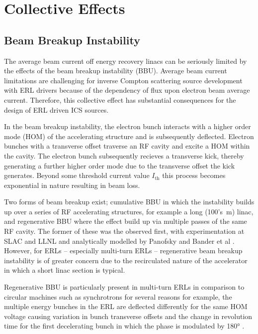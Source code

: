 \documentclass[../main.tex]{subfiles}
\begin{document}
\section{Collective Effects}

\subsection{Beam Breakup Instability}

The average beam current off energy recovery linacs can be seriously limited by the effects of the beam breakup instability (BBU). Average beam current limitations are challenging for inverse Compton scattering source development with ERL drivers because of the dependency of flux upon electron beam average current. Therefore, this collective effect has substantial consequences for the design of ERL driven ICS sources.

In the beam breakup instability, the electron bunch interacts with a higher order mode (HOM) of the accelerating structure and is subsequently deflected. Electron bunches with a transverse offset traverse an RF cavity and excite a HOM within the cavity. The electron bunch subsequently recieves a transverse kick, thereby generating a further higher order mode due to the transverse offset the kick generates. Beyond some threshold current value $I_{\mathrm{th}}$ this process becomes exponential in nature resulting in beam loss.

Two forms of beam breakup exist; cumulative BBU in which the instability builds up over a series of RF accelerating structures, for example a long (100's~\si{\meter}) linac, and regenerative BBU where the effect build up via multiple passes of the same RF cavity. The former of these was the observed first, with experimentation at SLAC \cite{panofsky1966electrons,altenmueller1966beam} and LLNL \cite{neil1970coherent} and analytically modelled by Panofsky and Bander et al \cite{panofsky1968asymptotic}. However, for ERLs -- especially multi-turn ERLs -- regenerative beam breakup instability is of greater concern due to the recirculated nature of the accelerator in which a short linac section is typical.

Regenerative BBU is particularly present in multi-turn ERLs in comparison to circular machines such as synchrotrons for several reasons for example, the multiple energy bunches in the ERL are deflected differently for the same HOM voltage causing variation in bunch transverse offsets and the change in revolution time for the first decelerating bunch in which the phase is modulated by 180\si{\degree} \cite{setiniyaz2021filling}.
\end{document}
